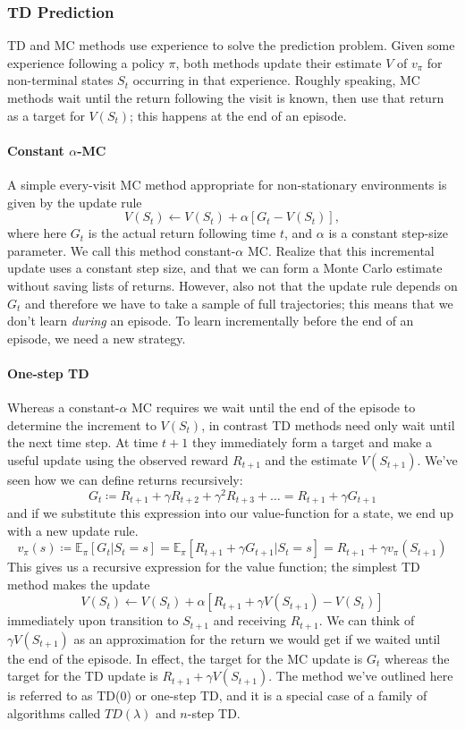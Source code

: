 \documentclass[12pt]{article}
\begin{document}
\subsubsection{TD Prediction}
TD and MC methods use experience to solve the prediction problem. Given some experience following a policy $\pi$, both methods update their estimate $V$ of $v_\pi$ for non-terminal states $S_t$ occurring in that experience. Roughly speaking, MC methods wait until the return following the visit is known, then use that return as a target for $V(S_t)$; this happens at the end of an episode. 
\paragraph{Constant $\alpha$-MC}
A simple every-visit MC method appropriate for non-stationary environments is given by the update rule
\[
  V(S_t) \gets V(S_t) + \alpha \left[ G_t - V(S_t)\right],
\]
where here $G_t$ is the actual return following time $t$, and $\alpha$ is a constant step-size parameter. We call this method constant-$\alpha$ MC. Realize that this incremental update uses a constant step size, and that we can form a Monte Carlo estimate without saving lists of returns. However, also not that the update rule depends on $G_t$ and therefore we have to take a sample of full trajectories; this means that we don't learn \emph{during} an episode. To learn incrementally before the end of an episode, we need a new strategy.

\paragraph{One-step TD}
Whereas a constant-$\alpha$ MC requires we wait until the end of the episode to determine the increment to $V(S_t)$, in contrast TD methods need only wait until the next time step. At time $t+1$ they immediately form a target and make a useful update using the observed reward $R_{t+1}$ and the estimate $V(S_{t+1})$.
We've seen how we can define returns recursively:
\[
  G_t \coloneqq R_{t+1} + \gamma R_{t+2} + \gamma^2 R_{t+3} + \ldots = R_{t+1} + \gamma G_{t+1}
\]
and if we substitute this expression into our value-function for a state, we end up with a new update rule.
\[
  v_\pi(s) \coloneqq \mathbb E_\pi \left[ G_t | S_t = s \right] = \mathbb E_\pi \left[ R_{t+1} + \gamma G_{t+1} | S_t = s \right] = R_{t+1} + \gamma v_\pi(S_{t+1})
\]
This gives us a recursive expression for the value function; the simplest TD method makes the update
\begin{equation}
  \label{eq: simplesttdupdate}
  V(S_t) \gets V(S_t) + \alpha \left[ R_{t+1} + \gamma V(S_{t+1}) - V(S_t)\right]
\end{equation}
immediately upon transition to $S_{t+1}$ and receiving $R_{t+1}$. We can think of $\gamma V(S_{t+1})$ as an approximation for the return we would get if we waited until the end of the episode. In effect, the target for the MC update is $G_t$ whereas the target for the TD update is $R_{t+1} + \gamma V(S_{t+1})$. The method we've outlined here is referred to as TD(0) or one-step TD, and it is a special case of a family of algorithms called $TD(\lambda)$ and $n$-step TD.
\end{document}
